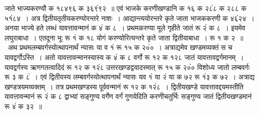 \documentclass[11pt, openany]{book}
\begin{document}
\noindent जाते भाज्यकरण्यौ क १८४९६ क ३६९ं९२~॥ एवं भाजके करणीखण्डानि क १६ क २८ं८ क २८८ क ५१ं८४~। अत्र द्वितीयतृतीयकरण्योरन्तरे नाशः~। आद्यान्त्ययोरन्तरे कृते जाता भाजककरणी क ४६ं२४~। अनया भाज्ये हते लब्धं यावत्तावन्मानं क ४ं क ८~। प्रथमकरण्या मूले गृहीते जातं रू २ं क ८~। इयमेव लघुराबाधा~। एतदूना भूः रू १ं क १८ 
योगं करण्योरित्यन्तरे कृते जाता द्वितीयाबाधा~। रू १ क २~॥~अथ 
प्रथमलम्बवर्गस्योत्थापनार्थं न्यासः या व १ं रू १५ क २०ं०~। अत्राद्यमेव 
खण्डमव्यक्तं स च यावद्वर्गोऽस्ति~। अतो यावत्तावन्मानस्यास्य क ४ं क ८
वर्गो रू १२ क १२८ जातं यावत्तावद्वर्गमानम्~। यावद्वर्गस्य ऋणगतत्वादिदं रू १२ क १२ं८ उत्तरखण्डद्वयादस्मात् रू १५ क २०ं० विशोध्य
जातो लम्बवर्गः रू ३ क ८ं~। एवं द्वितीयस्य लम्बवर्गस्योत्थापनार्थं न्यासः 
यव १ं या २ं या क ७२ रू १ं३ क ७२~। अत्राद्य खण्डत्रयमव्यक्तम्~। 
तत्र प्रथमखण्डस्य पूर्ववन्मानं रू १२ क १२ं८~। द्वितीयखण्डे
यावत्तावद्दयमस्तीति यावत्तावन्मानं रू २ं क ८ द्वाभ्यां सङ्गुण्य वर्गेण वर्गं गुणयेदिति 
करणीचतुर्भिः सङ्गुण्य जातं द्वितीयखण्डमानं रू ४ं क ३२~॥~\\
\end{document}
